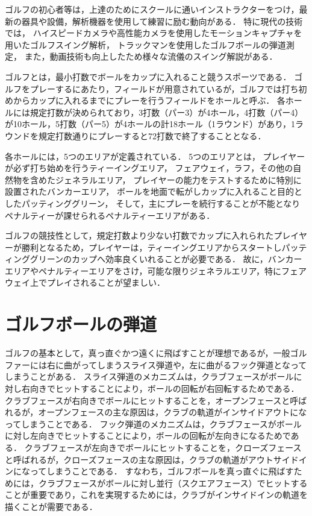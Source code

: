 ゴルフの初心者等は，上達のためにスクールに通いインストラクターをつけ，最新の器具や設備，解析機器を使用して練習に励む動向がある．
特に現代の技術では，
ハイスピードカメラや高性能カメラを使用したモーションキャプチャを用いたゴルフスイング解析，
トラックマンを使用したゴルフボールの弾道測定，
また，動画技術も向上したため様々な流儀のスイング解説がある．

ゴルフとは，最小打数でボールをカップに入れること競うスポーツである．
ゴルフをプレーするにあたり，フィールドが用意されているが，ゴルフでは打ち初めからカップに入れるまでにプレーを行うフィールドをホールと呼ぶ．
各ホールには規定打数が決められており，3打数（パー3）が4ホール，4打数（パー4）が10ホール，5打数（パー5）が4ホールの計18ホール（1ラウンド）があり，1ラウンドを規定打数通りにプレーすると72打数で終了することとなる．

各ホールには，5つのエリアが定義されている．
5つのエリアとは，
プレイヤーが必ず打ち始めを行うティーイングエリア，
フェアウェイ，ラフ，その他の自然物を含めたジェネラルエリア，
プレイヤーの能力をテストするために特別に設置されたバンカーエリア，
ボールを地面で転がしカップに入れること目的としたパッティンググリーン，
そして，主にプレーを続行することが不能となりペナルティーが課せられるペナルティーエリアがある．

ゴルフの競技性として，規定打数より少ない打数でカップに入れられたプレイヤーが勝利となるため，プレイヤーは，ティーイングエリアからスタートしパッティンググリーンのカップへ効率良くいれることが必要である．
故に，バンカーエリアやペナルティーエリアをさけ，可能な限りジェネラルエリア，特にフェアウェイ上でプレイされることが望ましい．

\section{ゴルフボールの弾道}
ゴルフの基本として，真っ直ぐかつ遠くに飛ばすことが理想であるが，一般ゴルファーには右に曲がってしまうスライス弾道や，左に曲がるフック弾道となってしまうことがある．
スライス弾道のメカニズムは，クラブフェースがボールに対し右向きでヒットすることにより，ボールの回転が右回転するためである．
クラブフェースが右向きでボールにヒットすることを，オープンフェースと呼ばれるが，オープンフェースの主な原因は，クラブの軌道がインサイドアウトになってしまうことである．
フック弾道のメカニズムは，クラブフェースがボールに対し左向きでヒットすることにより，ボールの回転が左向きになるためである．
クラブフェースが左向きでボールにヒットすることを，クローズフェースと呼ばれるが，クローズフェースの主な原因は，クラブの軌道がアウトサイドインになってしまうことである．
すなわち，ゴルフボールを真っ直ぐに飛ばすためには，クラブフェースがボールに対し並行（スクエアフェース）でヒットすることが重要であり，これを実現するためには，クラブがインサイドインの軌道を描くことが需要である．

